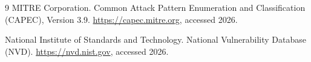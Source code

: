 \documentclass[11pt]{article}
\begin{document}
\begin{thebibliography}{9}
MITRE Corporation.
\newblock Common Attack Pattern Enumeration and Classification (CAPEC), Version 3.9.
\newblock \url{https://capec.mitre.org}, accessed 2026.

National Institute of Standards and Technology.
\newblock National Vulnerability Database (NVD).
\newblock \url{https://nvd.nist.gov}, accessed 2026.

\end{thebibliography}
\end{document}
